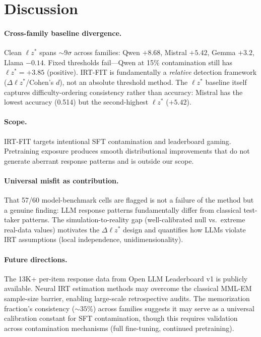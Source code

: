 \documentclass[11pt,twocolumn]{article}
\newcommand{\lzs}{\ensuremath{\ell z^*}}
\begin{document}
\section{Discussion}

\paragraph{Cross-family baseline divergence.} Clean $\lzs$ spans ${\sim}9\sigma$ across families: Qwen $+8.68$, Mistral $+5.42$, Gemma $+3.2$, Llama $-0.14$. Fixed thresholds fail---Qwen at 15\% contamination still has $\lzs = +3.85$ (positive). IRT-FIT is fundamentally a \emph{relative} detection framework ($\Delta\lzs$/Cohen's $d$), not an absolute threshold method. The $\lzs$ baseline itself captures difficulty-ordering consistency rather than accuracy: Mistral has the lowest accuracy (0.514) but the second-highest $\lzs$ ($+5.42$).

\paragraph{Scope.} IRT-FIT targets intentional SFT contamination and leaderboard gaming. Pretraining exposure produces smooth distributional improvements that do not generate aberrant response patterns and is outside our scope.

\paragraph{Universal misfit as contribution.} That 57/60 model-benchmark cells are flagged is not a failure of the method but a genuine finding: LLM response patterns fundamentally differ from classical test-taker patterns. The simulation-to-reality gap (well-calibrated null vs.\ extreme real-data values) motivates the $\Delta\lzs$ design and quantifies how LLMs violate IRT assumptions (local independence, unidimensionality).

\paragraph{Future directions.} The 13K+ per-item response data from Open LLM Leaderboard v1 is publicly available. Neural IRT estimation methods \citep{polo2024psnirt} may overcome the classical MML-EM sample-size barrier, enabling large-scale retrospective audits. The memorization fraction's consistency (${\sim}35\%$) across families suggests it may serve as a universal calibration constant for SFT contamination, though this requires validation across contamination mechanisms (full fine-tuning, continued pretraining).
\end{document}
